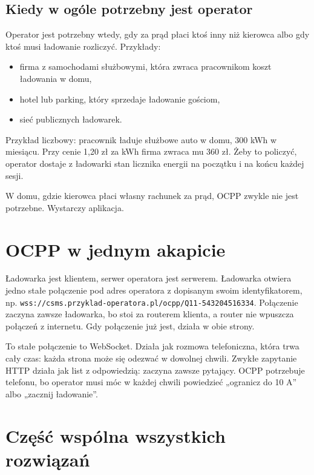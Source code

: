 \documentclass[11pt,a4paper]{article}
\begin{document}
\subsection{Kiedy w ogóle potrzebny jest operator}

Operator jest potrzebny wtedy, gdy za prąd płaci ktoś inny niż kierowca albo gdy ktoś musi ładowanie rozliczyć. Przykłady:


\begin{itemize}
\item firma z samochodami służbowymi, która zwraca pracownikom koszt ładowania w domu,
\item hotel lub parking, który sprzedaje ładowanie gościom,
\item sieć publicznych ładowarek.
\end{itemize}

Przykład liczbowy: pracownik ładuje służbowe auto w domu, 300 kWh w miesiącu. Przy cenie 1,20 zł za kWh firma zwraca mu 360 zł. Żeby to policzyć, operator dostaje z ładowarki stan licznika energii na początku i na końcu każdej sesji.


W domu, gdzie kierowca płaci własny rachunek za prąd, OCPP zwykle nie jest potrzebne. Wystarczy aplikacja.


\section{OCPP w jednym akapicie}

Ładowarka jest klientem, serwer operatora jest serwerem. Ładowarka otwiera jedno stałe połączenie pod adres operatora z dopisanym swoim identyfikatorem, np. \texttt{wss:\allowbreak{}/\allowbreak{}/\allowbreak{}csms.\allowbreak{}przyklad-\allowbreak{}operatora.\allowbreak{}pl/\allowbreak{}ocpp/\allowbreak{}Q11-\allowbreak{}543204516334}. Połączenie zaczyna zawsze ładowarka, bo stoi za routerem klienta, a router nie wpuszcza połączeń z internetu. Gdy połączenie już jest, działa w obie strony.


To stałe połączenie to WebSocket. Działa jak rozmowa telefoniczna, która trwa cały czas: każda strona może się odezwać w dowolnej chwili. Zwykłe zapytanie HTTP działa jak list z odpowiedzią: zaczyna zawsze pytający. OCPP potrzebuje telefonu, bo operator musi móc w każdej chwili powiedzieć „ogranicz do 10 A” albo „zacznij ładowanie”.


\section{Część wspólna wszystkich rozwiązań}
\end{document}
